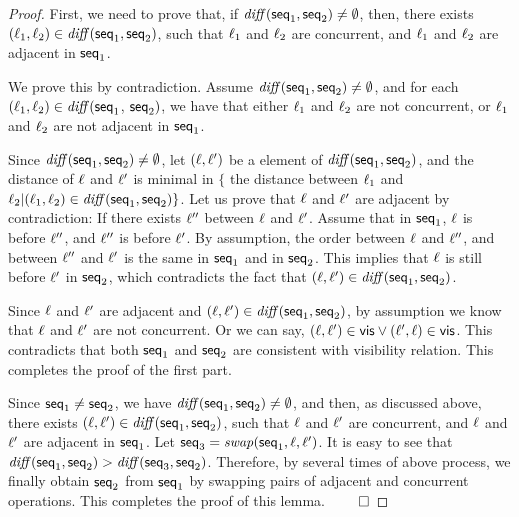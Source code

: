 \begin {proof}

First, we need to prove that, if $\mathit{diff}(\mathsf{seq}_1,\mathsf{seq}_2) \neq \emptyset$, then, there exists $(\ell_1,\ell_2) \in \mathit{diff}(\mathsf{seq}_1,\mathsf{seq}_2)$, such that $\ell_1$ and $\ell_2$ are concurrent, and $\ell_1$ and $\ell_2$ are adjacent in $\mathsf{seq}_1$.

We prove this by contradiction. Assume $\mathit{diff}(\mathsf{seq}_1,\mathsf{seq}_2) \neq \emptyset$, and for each $(\ell_1,\ell_2) \in \mathit{diff}(\mathsf{seq}_1$, $\mathsf{seq}_2)$, we have that either $\ell_1$ and $\ell_2$ are not concurrent, or $\ell_1$ and $\ell_2$ are not adjacent in $\mathsf{seq}_1$.

Since $\mathit{diff}(\mathsf{seq}_1,\mathsf{seq}_2) \neq \emptyset$, let $(\ell,\ell')$ be a element of $\mathit{diff}(\mathsf{seq}_1,\mathsf{seq}_2)$, and the distance of $\ell$ and $\ell'$ is minimal in $\{$ the distance between $\ell_1$ and $\ell_2 \vert (\ell_1,\ell_2) \in \mathit{diff}(\mathsf{seq}_1,\mathsf{seq}_2) \}$. Let us prove that $\ell$ and $\ell'$ are adjacent by contradiction: If there exists $\ell''$ between $\ell$ and $\ell'$. Assume that in $\mathsf{seq}_1$, $\ell$ is before $\ell''$, and $\ell''$ is before $\ell'$. By assumption, the order between $\ell$ and $\ell''$, and between $\ell''$ and $\ell'$ is the same in $\mathsf{seq}_1$ and in $\mathsf{seq}_2$. This implies that $\ell$ is still before $\ell'$ in $\mathsf{seq}_2$, which contradicts the fact that $(\ell,\ell') \in \mathit{diff}(\mathsf{seq}_1,\mathsf{seq}_2)$.

Since $\ell$ and $\ell'$ are adjacent and $(\ell,\ell') \in \mathit{diff}(\mathsf{seq}_1,\mathsf{seq}_2)$, by assumption we know that $\ell$ and $\ell'$ are not concurrent. Or we can say, $(\ell,\ell') \in \mathsf{vis} \vee (\ell',\ell) \in \mathsf{vis}$. This contradicts that both $\mathsf{seq}_1$ and $\mathsf{seq}_2$ are consistent with visibility relation. This completes the proof of the first part.

Since $\mathsf{seq}_1 \neq \mathsf{seq}_2$, we have $\mathit{diff}(\mathsf{seq}_1,\mathsf{seq}_2) \neq \emptyset$, and then, as discussed above, there exists $(\ell,\ell') \in \mathit{diff}(\mathsf{seq}_1,\mathsf{seq}_2)$, such that $\ell$ and $\ell'$ are concurrent, and $\ell$ and $\ell'$ are adjacent in $\mathsf{seq}_1$. Let $\mathsf{seq}_3 = \mathit{swap}(\mathsf{seq}_1,\ell,\ell')$. It is easy to see that $\mathit{diff}(\mathsf{seq}_1,\mathsf{seq}_2) > \mathit{diff}(\mathsf{seq}_3,\mathsf{seq}_2)$. Therefore, by several times of above process, we finally obtain $\mathsf{seq}_2$ from $\mathsf{seq}_1$ by swapping pairs of adjacent and concurrent operations. This completes the proof of this lemma. $\qed$
\end {proof}



